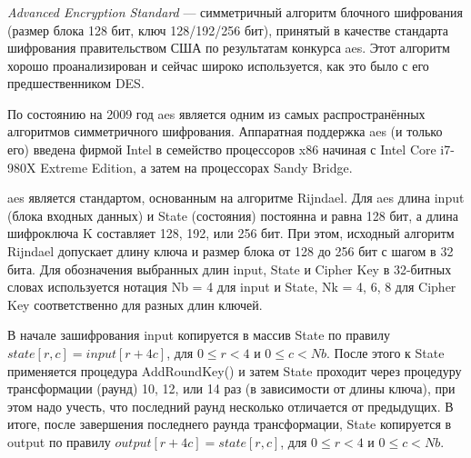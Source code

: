 \subsubsection{}
\label{sec:analysis:research:crypto:aes}

\emph{Advanced Encryption Standard} --- симметричный алгоритм блочного шифрования (размер блока 128 бит, ключ 128/192/256 бит), принятый в качестве стандарта шифрования правительством США по результатам конкурса \gls{aes}. Этот алгоритм хорошо проанализирован и сейчас широко используется, как это было с его предшественником DES\cite{wiki:aes}.

По состоянию на 2009 год \gls{aes} является одним из самых распространённых алгоритмов симметричного шифрования\cite{thg:aes}. Аппаратная поддержка \gls{aes} (и только его) введена фирмой Intel в семейство процессоров x86 начиная с Intel Core i7-980X Extreme Edition, а затем на процессорах Sandy Bridge.

\gls{aes} является стандартом, основанным на алгоритме Rijndael. Для \gls{aes} длина input (блока входных данных) и State (состояния) постоянна и равна 128 бит, а длина шифроключа K составляет 128, 192, или 256 бит. При этом, исходный алгоритм Rijndael допускает длину ключа и размер блока от 128 до 256 бит с шагом в 32 бита. Для обозначения выбранных длин input, State и Cipher Key в 32-битных словах используется нотация Nb = 4 для input и State, Nk = 4, 6, 8 для Cipher Key соответственно для разных длин ключей.

В начале зашифрования input копируется в массив State по правилу \(state[r,c]=input[r+4c]\), для \(0 \leq r < 4\) и \(0 \leq c < Nb\). После этого к State применяется процедура AddRoundKey() и затем State проходит через процедуру трансформации (раунд) 10, 12, или 14 раз (в зависимости от длины ключа), при этом надо учесть, что последний раунд несколько отличается от предыдущих. В итоге, после завершения последнего раунда трансформации, State копируется в output по правилу \(output[r+4c]=state[r,c]\), для \(0 \leq r < 4\) и \(0 \leq c < Nb\).